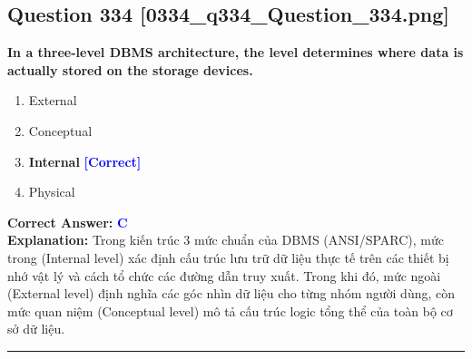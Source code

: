\documentclass[11pt,a4paper]{article}
\begin{document}
\begin{minipage}{\textwidth}
\subsection*{Question 334 \quad \footnotesize{[0334\_q334\_Question\_334.png]}}
\noindent \textbf{In a three-level DBMS architecture, the level determines where data is actually stored on the storage devices.}

\begin{enumerate}[label=\Alph*.]
    \item External
    \item Conceptual
    \item \textbf{Internal} \hfill \textcolor{blue}{\textbf{[Correct]}}
    \item Physical
\end{enumerate}

\noindent \textbf{Correct Answer:} \textcolor{blue}{\textbf{C}} \\[2pt]
\noindent \textbf{Explanation:} Trong kiến trúc 3 mức chuẩn của DBMS (ANSI/SPARC), mức trong (Internal level) xác định cấu trúc lưu trữ dữ liệu thực tế trên các thiết bị nhớ vật lý và cách tổ chức các đường dẫn truy xuất. Trong khi đó, mức ngoài (External level) định nghĩa các góc nhìn dữ liệu cho từng nhóm người dùng, còn mức quan niệm (Conceptual level) mô tả cấu trúc logic tổng thể của toàn bộ cơ sở dữ liệu.

\par\vspace{0.3cm}
\hrule
\vspace{0.3cm}
\end{minipage}
\end{document}
